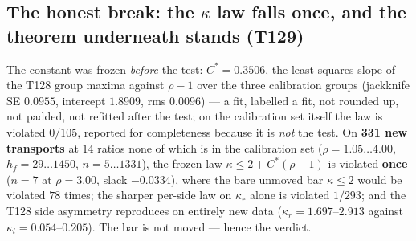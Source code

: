 \documentclass[11pt,a4paper]{article}
\begin{document}
\subsection{The honest break: the $\kappa$ law falls once, and the theorem underneath stands (T129)}
The constant was frozen \emph{before} the test: $C^*=0.3506$, the least-squares slope of the
T128 group maxima against $\rho-1$ over the three calibration groups (jackknife SE $0.0955$,
intercept $1.8909$, rms $0.0096$) --- a fit, labelled a fit, not rounded up, not padded, not
refitted after the test; on the calibration set itself the law is violated $0/105$, reported
for completeness because it is \emph{not} the test. On \textbf{331 new transports} at $14$
ratios none of which is in the calibration set ($\rho=1.05\ldots4.00$, $h_f=29\ldots1450$,
$n=5\ldots1331$), the frozen law $\kappa\le2+C^*(\rho-1)$ is violated \textbf{once} ($n=7$ at
$\rho=3.00$, slack $-0.0334$), where the bare unmoved bar $\kappa\le2$ would be violated $78$
times; the sharper per-side law on $\kappa_r$ alone is violated $1/293$; and the T128 side
asymmetry reproduces on entirely new data ($\kappa_r=1.697$--$2.913$ against
$\kappa_l=0.054$--$0.205$). The bar is not moved --- hence the verdict.
\end{document}
